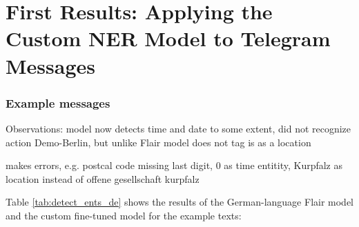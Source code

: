 \chapter{First Results: Applying the Custom NER Model to Telegram Messages}
\label{cha:application}

\subsection{Example messages}

Observations: model now detects time and date to some extent, did not recognize action Demo-Berlin, but unlike Flair model does not tag is as a location

makes errors, e.g. postcal code missing last digit, 0 as time entitity, Kurpfalz as location instead of offene gesellschaft kurpfalz 

Table \ref{tab:detect_ents_de} shows the results of the German-language Flair model and the custom fine-tuned  model for the example texts: 

